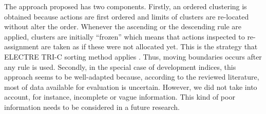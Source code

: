 \documentclass[]{elsarticle}
\theoremstyle{definition}
\begin{document}
The approach proposed has two components. Firstly, an ordered clustering is obtained because actions are first ordered and limits of clusters are re-located without alter the order.  Whenever the ascending or the descending rule are applied, clusters are initially ``frozen'' which means that actions inspected to re-assignment are taken as if these were not allocated yet.  This is the strategy that ELECTRE TRI-C sorting method applies \citep{almeida2008}.  Thus, moving boundaries occurs after any rule is used.   Secondly, in the special case of development indices, this approach seems to be well-adapted because, according to the reviewed literature, most of data available for evaluation is uncertain.  However,  we did not take into account, for instance, incomplete or vague information.  This kind of poor information needs to be considered in a future research.


\end{document}
